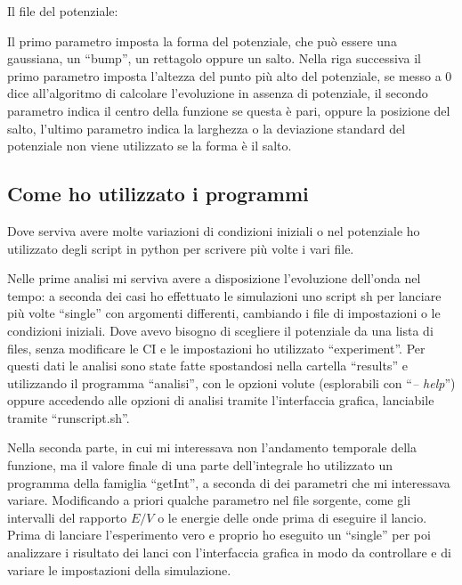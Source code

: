 Il file del potenziale:

Il primo parametro imposta la forma del potenziale, che pu\`o essere una gaussiana, un ``bump'', un rettagolo oppure un salto.
Nella riga successiva il primo parametro imposta l'altezza  del punto pi\`u alto del potenziale, se messo a 0 dice all'algoritmo di calcolare l'evoluzione in assenza di potenziale, il secondo parametro indica il centro della funzione se questa \`e pari, oppure la posizione del salto, l'ultimo parametro indica la larghezza o la deviazione standard del potenziale non viene utilizzato se la forma \`e il salto.

\subsection{Come ho utilizzato i programmi}
Dove serviva avere molte variazioni di condizioni iniziali o nel potenziale ho utilizzato degli script in python per scrivere pi\`u volte i vari file.

Nelle prime analisi mi serviva avere a disposizione l'evoluzione dell'onda nel tempo: a seconda dei casi ho effettuato le simulazioni uno script sh per lanciare pi\`u volte ``single'' con argomenti differenti, cambiando i file di impostazioni o le condizioni iniziali. Dove avevo bisogno di scegliere il potenziale da una lista di files, senza modificare le CI e le impostazioni ho utilizzato ``experiment''.
Per questi dati le analisi sono state fatte spostandosi nella cartella ``results'' e utilizzando il programma ``analisi'', con le opzioni volute (esplorabili con ``\textit{-- help}'') oppure accedendo alle opzioni di analisi tramite l'interfaccia grafica, lanciabile tramite ``runscript.sh''.

Nella seconda parte, in cui mi interessava non l'andamento temporale della funzione, ma il valore finale di una parte dell'integrale ho utilizzato un programma della famiglia ``getInt'', a seconda di dei parametri che mi interessava variare. Modificando a priori qualche parametro nel file sorgente, come gli intervalli del rapporto $E/V$ o le energie delle onde prima di eseguire il lancio.
Prima di lanciare l'esperimento vero e proprio ho eseguito un ``single'' per poi analizzare i risultato dei lanci con l'interfaccia grafica in modo da controllare e di variare le impostazioni della simulazione.

